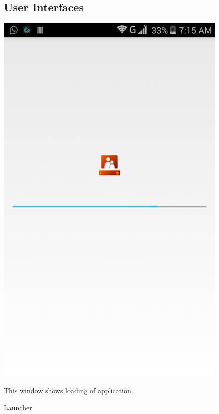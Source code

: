 \begin{itemize}
\begin{figure}
\subsection{User Interfaces}
\label{User Interfaces}
\begin{center}
\scalebox{0.25}
{\includegraphics{launch.png}}
\caption{Launcher}  
\end{center}
This window shows loading of application.
\end{figure}



\end{itemize}
